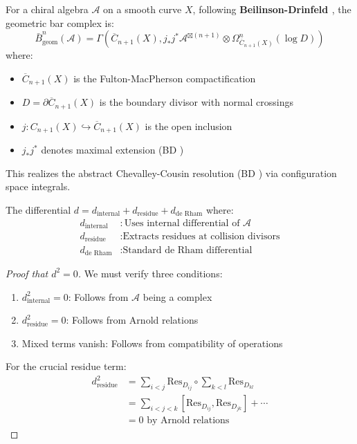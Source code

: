 \begin{definition}\label{def:geometric-bar}
For a chiral algebra $\mathcal{A}$ on a smooth curve $X$, following 
\textbf{Beilinson-Drinfeld \cite[Theorem 3.4.9]{BD04}}, 
the geometric bar complex is:
$$\bar{B}_{\text{geom}}^n(\mathcal{A}) = \Gamma\left(\overline{C}_{n+1}(X), j_*j^*\mathcal{A}^{\boxtimes(n+1)} \otimes \Omega^n_{\overline{C}_{n+1}(X)}(\log D)\right)$$
where:
\begin{itemize}
\item $\overline{C}_{n+1}(X)$ is the Fulton-MacPherson compactification \cite{FM94}
\item $D = \partial \overline{C}_{n+1}(X)$ is the boundary divisor with normal crossings
\item $j: C_{n+1}(X) \hookrightarrow \overline{C}_{n+1}(X)$ is the open inclusion
\item $j_*j^*$ denotes maximal extension 
(BD \cite[§3.4.4, (3.4.4.2)]{BD04})
\end{itemize}

This realizes the abstract Chevalley-Cousin resolution 
(BD \cite[§3.4.10--3.4.12]{BD04}) via configuration space integrals.
\end{definition}

\begin{theorem}\label{thm:bar-differential}
The differential $d = d_{\text{internal}} + d_{\text{residue}} + d_{\text{de Rham}}$ where:
\begin{align}
d_{\text{internal}} &: \text{Uses internal differential of } \mathcal{A} \\
d_{\text{residue}} &: \text{Extracts residues at collision divisors} \\
d_{\text{de Rham}} &: \text{Standard de Rham differential}
\end{align}
\end{theorem}

\begin{proof}[Proof that $d^2 = 0$]
We must verify three conditions:
\begin{enumerate}
\item $d_{\text{internal}}^2 = 0$: Follows from $\mathcal{A}$ being a complex
\item $d_{\text{residue}}^2 = 0$: Follows from Arnold relations
\item Mixed terms vanish: Follows from compatibility of operations
\end{enumerate}

For the crucial residue term:
\begin{align}
d_{\text{residue}}^2 &= \sum_{i<j} \text{Res}_{D_{ij}} \circ \sum_{k<l} \text{Res}_{D_{kl}} \\
&= \sum_{i<j<k} [\text{Res}_{D_{ij}}, \text{Res}_{D_{jk}}] + \cdots \\
&= 0 \text{ by Arnold relations}
\end{align}
\end{proof}

